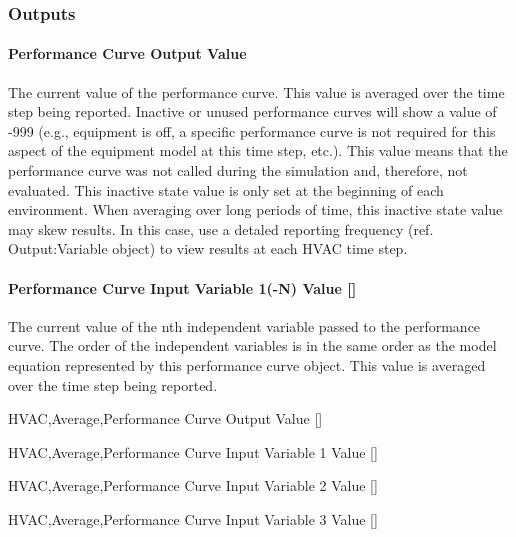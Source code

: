 \subsubsection{Outputs}\label{outputs-021}

\paragraph{Performance Curve Output Value}\label{performance-curve-output-value}

The current value of the performance curve. This value is averaged over the time step being reported. Inactive or unused performance curves will show a value of -999 (e.g., equipment is off, a specific performance curve is not required for this aspect of the equipment model at this time step, etc.). This value means that the performance curve was not called during the simulation and, therefore, not evaluated. This inactive state value is only set at the beginning of each environment. When averaging over long periods of time, this inactive state value may skew results. In this case, use a detaled reporting frequency (ref. Output:Variable object) to view results at each HVAC time step.

\paragraph{Performance Curve Input Variable 1(-N) Value {[]}}\label{performance-curve-input-variable-1-n-value}

The current value of the nth independent variable passed to the performance curve. The order of the independent variables is in the same order as the model equation represented by this performance curve object. This value is averaged over the time step being reported.

HVAC,Average,Performance Curve Output Value {[]}

HVAC,Average,Performance Curve Input Variable 1 Value {[]}

HVAC,Average,Performance Curve Input Variable 2 Value {[]}

HVAC,Average,Performance Curve Input Variable 3 Value {[]}